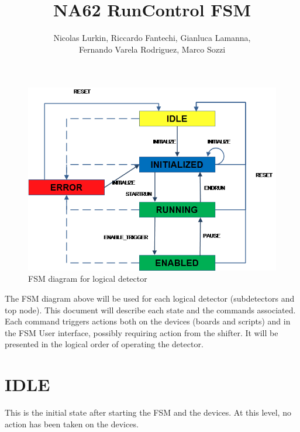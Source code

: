 \documentclass[a4paper]{article}
\title{NA62 RunControl FSM}           %
\author{Nicolas Lurkin,  Riccardo Fantechi,  Gianluca Lamanna,\\ Fernando Varela Rodriguez, Marco Sozzi}
\begin{document}
\maketitle                  %


\begin{figure}[hn]
	\includegraphics[width=\textwidth]{NA62FSM2.png}
	\caption{FSM diagram for logical detector}
\end{figure}

The FSM diagram above will be used for each logical detector (subdetectors and top node). This document will describe each state and the commands associated. Each command triggers actions both on the devices (boards and scripts) and in the FSM User interface, possibly requiring action from the shifter. It will be presented in the logical order of operating the detector.

%
%

\section{IDLE} 
This is the initial state after starting the FSM and the devices. At this level, no action has been taken on the devices.
\end{document}
